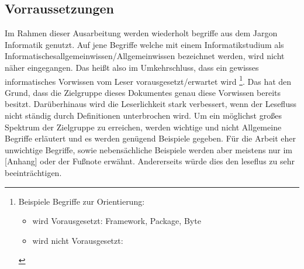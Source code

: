 \subsection{Vorraussetzungen}

Im Rahmen dieser Ausarbeitung werden wiederholt begriffe aus dem Jargon Informatik genutzt. Auf jene Begriffe welche mit einem Informatikstudium als Informatischesallgemeinwissen/Allgemeinwissen bezeichnet werden, wird nicht näher eingegangen. Das heißt also im Umkehrschluss, dass ein gewisses informatisches Vorwissen vom Leser vorausgesetzt/erwartet wird%
\footnote{Beispiele Begriffe zur Orientierung:
	\begin{itemize}[noitemsep,topsep=0pt,parsep=0pt,partopsep=0pt]
		\item wird Vorausgesetzt: Framework, Package, Byte
		\item wird nicht Vorausgesetzt: \myTodo
	\end{itemize}
	\nointerlineskip %
}. \newline
Das hat den Grund, dass die Zielgruppe dieses Dokumentes genau diese Vorwissen bereits besitzt. Darüberhinaus wird die Leserlichkeit stark verbessert, wenn der Lesefluss nicht ständig durch Definitionen unterbrochen wird. \newline
Um ein möglichst großes Spektrum der Zielgruppe zu erreichen, werden wichtige und nicht Allgemeine Begriffe erläutert und es werden genügend Beispiele gegeben. Für die Arbeit eher unwichtige Begriffe, sowie nebensächliche Beispiele werden aber meistens nur im [Anhang] oder der Fußnote erwähnt. Andererseits würde dies den leseflus zu sehr beeinträchtigen.